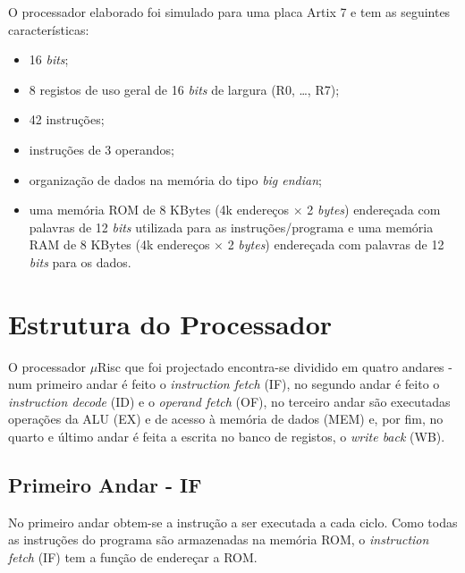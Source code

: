 \documentclass[11pt]{article}
\numberwithin{equation}{section}
\begin{document}
O processador elaborado foi simulado para uma placa Artix 7 e tem as seguintes características:

\vspace{-2mm}

\begin{itemize}
  \item 16 \textit{bits};
  \vspace{-2.5mm}
  \item 8 registos de uso geral de 16 \textit{bits} de largura (R0, \ldots, R7);
  \vspace{-2.5mm}
  \item 42 instruções;
  \vspace{-2.5mm}
  \item instruções de 3 operandos;
  \vspace{-2.5mm}
  \item organização de dados na memória do tipo \textit{big endian};
  \vspace{-2.5mm}
  \item uma memória ROM de 8 KBytes (4k endereços $\times$ 2 \textit{bytes}) endereçada com palavras de 12 \textit{bits} utilizada para as instruções/programa e uma memória RAM de 8 KBytes (4k endereços $\times$ 2 \textit{bytes}) endereçada com palavras de 12 \textit{bits} para os dados.
  
\end{itemize}

\section{Estrutura do Processador}

O processador $\mu$Risc que foi projectado encontra-se dividido em quatro andares - num primeiro andar é feito o \textit{instruction fetch} (IF), no segundo andar é feito o \textit{instruction decode} (ID) e o \textit{operand fetch} (OF), no terceiro andar são executadas operações da ALU (EX) e de acesso à memória de dados (MEM) e, por fim, no quarto e último andar é feita a escrita no banco de registos, o \textit{write back} (WB).

\subsection{Primeiro Andar - IF}

No primeiro andar obtem-se a instrução a ser executada a cada ciclo. Como todas as instruções do programa são armazenadas na memória ROM, o \textit{instruction fetch} (IF) tem a função de endereçar a ROM.
\end{document}
